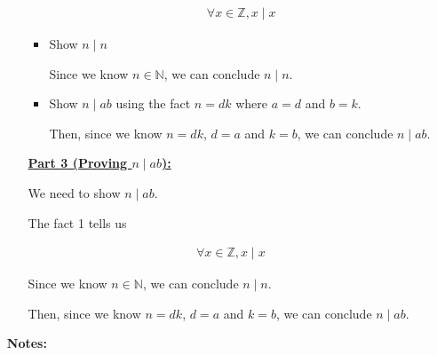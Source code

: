 \documentclass[12pt]{article}
\begin{document}
\begin{enumerate}[a.]
\begin{mdframed}
\begin{enumerate}[1.]
\begin{itemize}
\begin{mdframed}
            \begin{align}
                \forall x \in \mathbb{Z}, x \mid x
            \end{align}
            \end{mdframed}

            \item Show $n \mid n$

            \begin{mdframed}
            Since we know $n \in \mathbb{N}$, we can conclude $n \mid n$.
            \end{mdframed}

            \item Show $n \mid ab$ using the fact $n = dk$ where $a = d$ and $b = k$.

            \begin{mdframed}
            Then, since we know $n = dk$, $d = a$ and $k = b$, we can conclude
            $n \mid ab$.
            \end{mdframed}
        \end{itemize}

        \begin{mdframed}

        \underline{\textbf{Part 3 (Proving $n \mid ab$):}}

        \bigskip

        We need to show $n \mid ab$.

        \bigskip

        The fact 1 tells us

        \begin{align}
            \forall x \in \mathbb{Z}, x \mid x
        \end{align}

        \bigskip

        Since we know $n \in \mathbb{N}$, we can conclude $n \mid n$.

        \bigskip

        Then, since we know $n = dk$, $d = a$ and $k = b$, we can conclude
        $n \mid ab$.
        \end{mdframed}

    \end{enumerate}

    \end{mdframed}

    \bigskip

    \textbf{Notes:}


\end{enumerate}
\end{document}
